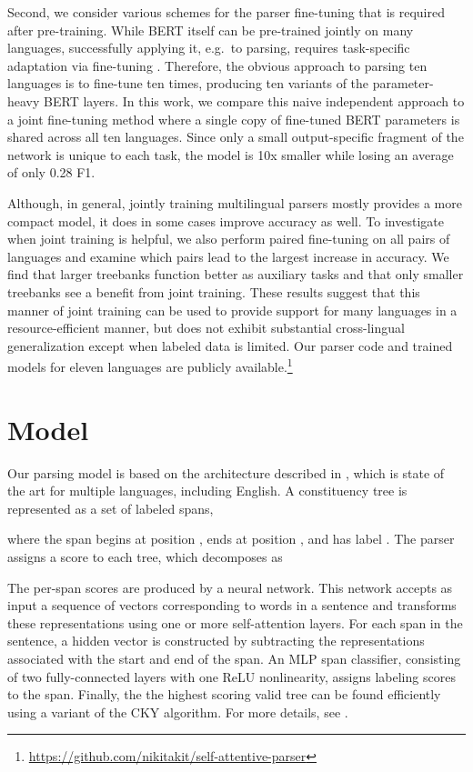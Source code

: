 \documentclass[11pt,a4paper]{article}
\begin{document}
Second, we consider various schemes for the parser fine-tuning that is required after pre-training. While BERT itself can be pre-trained jointly on many languages, successfully applying it, e.g.\ to parsing, requires task-specific adaptation via fine-tuning \cite{devlin_bert:2018}.  Therefore, the obvious approach to parsing ten languages is to fine-tune ten times, producing ten variants of the parameter-heavy BERT layers.  In this work, we compare this naive independent approach to a joint fine-tuning method where a single copy of fine-tuned BERT parameters is shared across all ten languages.  Since only a small output-specific fragment of the network is unique to each task, the model is 10x smaller while losing an average of only 0.28 F1.

Although, in general, jointly training multilingual parsers mostly provides a more compact model, it does in some cases improve accuracy as well. To investigate when joint training is helpful, we also perform paired fine-tuning on all pairs of languages and examine which pairs lead to the largest increase in accuracy. We find that larger treebanks function better as auxiliary tasks and that only smaller treebanks see a benefit from joint training. These results suggest that this manner of joint training can be used to provide support for many languages in a resource-efficient manner, but does not exhibit substantial cross-lingual generalization except when labeled data is limited.
Our parser code and trained models for eleven languages are publicly available.\footnote{\href{https://github.com/nikitakit/self-attentive-parser}{https://github.com/nikitakit/self-attentive-parser}}

\section{Model}

Our parsing model is based on the architecture described in \citet{kitaev_2018_self_attentive}, which is state of the art for multiple languages, including English.
A constituency tree  is represented as a set of labeled spans,

where the  span begins at position , ends at position , and has label . The parser assigns a score  to each tree, which decomposes as

The per-span scores  are produced by a neural network. This network accepts as input a sequence of vectors corresponding to words in a sentence and transforms these representations using one or more self-attention layers. For each span  in the sentence, a hidden vector  is constructed by subtracting the representations associated with the start and end of the span. An MLP span classifier, consisting of two fully-connected layers with one ReLU nonlinearity, assigns labeling scores  to the span. Finally, the the highest scoring valid tree  can be found efficiently using a variant of the CKY algorithm. For more details, see \citet{kitaev_2018_self_attentive}.
\end{document}
